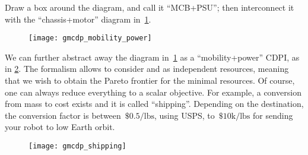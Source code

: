 \begin{example}

    Draw a box around the diagram, and call it ``MCB+PSU'';
    then interconnect it with the ``chassis+motor'' diagram in~\cref{fig:another}.


    \begin{figure}[h!]
        \centering
        \texttt{[image: gmcdp\_mobility\_power]}
        \caption{\label{fig:another}}
    \end{figure}

    We can further abstract away the diagram in~\cref{fig:another} as
    a ``mobility+power'' CDPI, as in \cref{fig:shipping}. The formalism
    allows to consider  and  as independent resources,
    meaning that we wish to obtain the Pareto frontier for the minimal
    resources. Of course, one can always reduce everything to a scalar
    objective. For example, a conversion from mass to cost exists and
    it is called ``shipping''. Depending on the destination, the conversion
    factor is between~$\$0.5/\mbox{lbs}$, using USPS, to~$\$10\mbox{k}/\mbox{lbs}$
    for sending your robot to low Earth orbit.


    \begin{figure}[h!]
        \centering{}
        \texttt{[image: gmcdp\_shipping]}\caption{\label{fig:shipping}}
    \end{figure}

\end{example}

